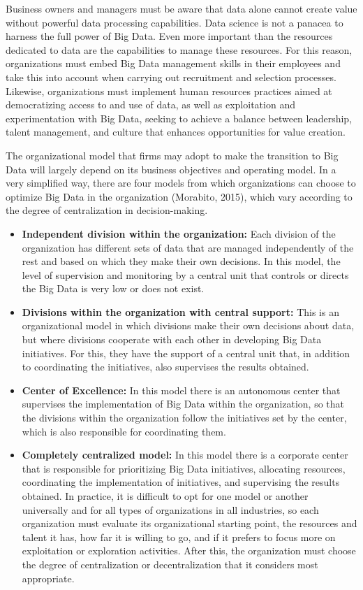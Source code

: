 \documentclass[
  letterpaper,
  DIV=11,
  numbers=noendperiod]{scrreprt}
\begin{document}
Business owners and managers must be aware that data alone cannot create
value without powerful data processing capabilities. Data science is not
a panacea to harness the full power of Big Data. Even more important
than the resources dedicated to data are the capabilities to manage
these resources. For this reason, organizations must embed Big Data
management skills in their employees and take this into account when
carrying out recruitment and selection processes. Likewise,
organizations must implement human resources practices aimed at
democratizing access to and use of data, as well as exploitation and
experimentation with Big Data, seeking to achieve a balance between
leadership, talent management, and culture that enhances opportunities
for value creation.

The organizational model that firms may adopt to make the transition to
Big Data will largely depend on its business objectives and operating
model. In a very simplified way, there are four models from which
organizations can choose to optimize Big Data in the organization
(Morabito, 2015), which vary according to the degree of centralization
in decision-making.

\begin{itemize}
\item
  \textbf{Independent division within the organization:} Each division
  of the organization has different sets of data that are managed
  independently of the rest and based on which they make their own
  decisions. In this model, the level of supervision and monitoring by a
  central unit that controls or directs the Big Data is very low or does
  not exist.
\item
  \textbf{Divisions within the organization with central support:} This
  is an organizational model in which divisions make their own decisions
  about data, but where divisions cooperate with each other in
  developing Big Data initiatives. For this, they have the support of a
  central unit that, in addition to coordinating the initiatives, also
  supervises the results obtained.
\item
  \textbf{Center of Excellence:} In this model there is an autonomous
  center that supervises the implementation of Big Data within the
  organization, so that the divisions within the organization follow the
  initiatives set by the center, which is also responsible for
  coordinating them.
\item
  \textbf{Completely centralized model:} In this model there is a
  corporate center that is responsible for prioritizing Big Data
  initiatives, allocating resources, coordinating the implementation of
  initiatives, and supervising the results obtained. In practice, it is
  difficult to opt for one model or another universally and for all
  types of organizations in all industries, so each organization must
  evaluate its organizational starting point, the resources and talent
  it has, how far it is willing to go, and if it prefers to focus more
  on exploitation or exploration activities. After this, the
  organization must choose the degree of centralization or
  decentralization that it considers most appropriate.
\end{itemize}
\end{document}
